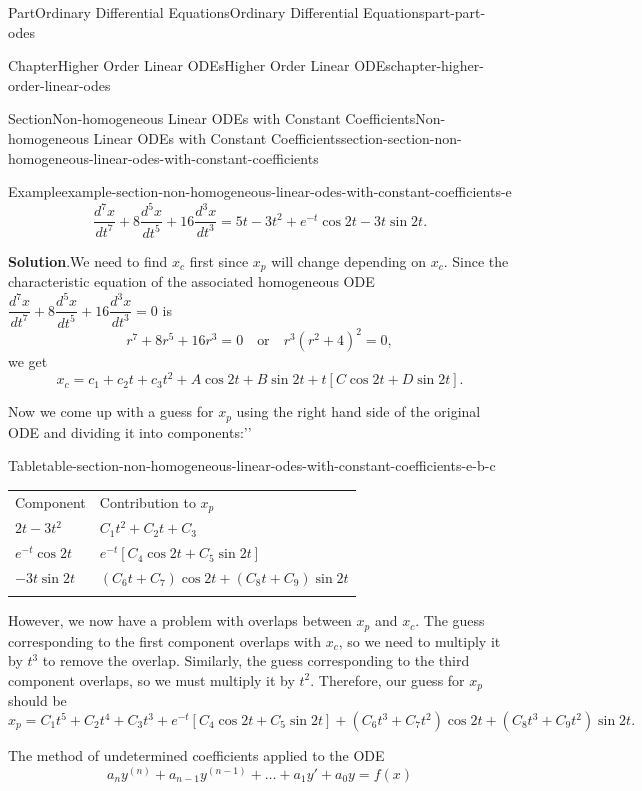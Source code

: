\documentclass[twoside,10pt,]{book}
\newcommand{\blocktitlefont}{\relax}
\newcommand{\tabularfont}{\relax}
\numberwithin{equation}{part}
\newcommand{\hrulethick} {\noalign{\hrule height 0.11em}}
\newcommand{\dv}[3][]{\dfrac{d^{#1} #2}{d #3^{#1}}}
\newcommand{\brackets}[1]{\left[ #1 \right]}
\newcommand{\parens}[1]{\left( #1 \right)}
\begin{document}
\begin{partptx}{Part}{Ordinary Differential Equations}{}{Ordinary Differential Equations}{}{}{part-part-odes}
\begin{chapterptx}{Chapter}{Higher Order Linear ODEs}{}{Higher Order Linear ODEs}{}{}{chapter-higher-order-linear-odes}
\begin{sectionptx}{Section}{Non-homogeneous Linear ODEs with Constant Coefficients}{}{Non-homogeneous Linear ODEs with Constant Coefficients}{}{}{section-section-non-homogeneous-linear-odes-with-constant-coefficients}
\begin{example}{Example}{}{example-section-non-homogeneous-linear-odes-with-constant-coefficients-e}
\begin{equation*}
\dv[7]{x}{t}+8\dv[5]{x}{t}+16\dv[3]{x}{t} = 5t-3t^{2}+e^{-t}\cos2t-3t\sin2t.
\end{equation*}
%
\par\smallskip%
\noindent\textbf{\blocktitlefont Solution}.\hypertarget{solution-section-non-homogeneous-linear-odes-with-constant-coefficients-e-b}{}\quad{}We need to find \(x_{c}\) first since \(x_{p}\) will change depending on \(x_{c}\). Since the characteristic equation of the associated homogeneous ODE \(\dv[7]{x}{t}+8\dv[5]{x}{t}+16\dv[3]{x}{t}=0\) is%
\begin{equation*}
r^{7}+8r^{5}+16r^{3} = 0\quad\text{or}\quad r^{3}(r^{2}+4)^{2}=0,
\end{equation*}
we get%
\begin{equation*}
x_{c} = c_{1}+c_{2}t+c_{3}t^{2}+A\cos2t+B\sin2t + t\brackets{C\cos2t+D\sin2t}.
\end{equation*}
%
\par
Now we come up with a guess for \(x_{p}\) using the right hand side of the original ODE and dividing it into \textasciigrave{}\textasciigrave{}components:'{}'{}%
\begin{tableptx}{Table}{\textbf{}}{table-section-non-homogeneous-linear-odes-with-constant-coefficients-e-b-c}{}%
\centering%
{\tabularfont%
\begin{tabular}{ll}\hrulethick
Component&Contribution to \(x_{p}\)\tabularnewline\hrulethick
\(2t-3t^{2}\)&\(C_{1}t^{2}+C_{2}t+C_{3}\)\tabularnewline[0pt]
\(e^{-t}\cos2t\)&\(e^{-t}\brackets{C_{4}\cos2t+C_{5}\sin2t}\)\tabularnewline[0pt]
\(-3t\sin2t\)&\(\parens{C_{6}t+C_{7}}\cos2t+\parens{C_{8}t+C_{9}}\sin2t\)\tabularnewline\hrulethick
\end{tabular}
}%
\end{tableptx}%
However, we now have a problem with overlaps between \(x_{p}\) and \(x_{c}\). The guess corresponding to the first component overlaps with \(x_{c}\), so we need to multiply it by \(t^{3}\) to remove the overlap. Similarly, the guess corresponding to the third component overlaps, so we must multiply it by \(t^{2}\). Therefore, our guess for \(x_{p}\) should be%
\begin{equation*}
x_{p} = C_{1}t^{5}+C_{2}t^{4}+C_{3}t^{3}+e^{-t}\brackets{C_{4}\cos2t+C_{5}\sin2t}+(C_{6}t^{3}+C_{7}t^{2})\cos2t+(C_{8}t^{3}+C_{9}t^{2})\sin2t.
\end{equation*}
%
\end{example}
The method of undetermined coefficients applied to the ODE%
\begin{equation*}
a_{n}y^{(n)}+a_{n-1}y^{(n-1)}+\dots+a_{1}y'+a_{0}y = f(x)   

\end{equation*}
\end{sectionptx}
\end{chapterptx}
\end{partptx}
\end{document}
